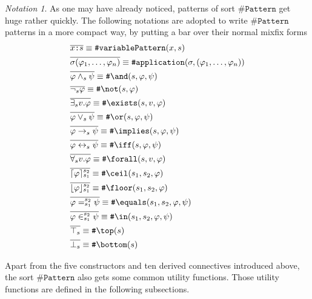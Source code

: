 \documentclass[UTF8,11pt]{article}
\newcounter{thmcounter}
\theoremstyle{plain}
\theoremstyle{definition}
\theoremstyle{remark}
\newtheorem{notation}   [thmcounter]{Notation}
\DeclarePairedDelimiter{\ceil}{\lceil}{\rceil}
\DeclarePairedDelimiter{\floor}{\lfloor}{\rfloor}
\newcommand{\cln}{\texttt{:}}
\newcommand{\sharpsymbol}{\#}
\newcommand{\KvariablePattern}{\texttt{\sharpsymbol variablePattern}}
\newcommand{\KPattern}{\texttt{\sharpsymbol Pattern}}
\newcommand{\Kand}{\texttt{\sharpsymbol  \slashsymbol and}}
\newcommand{\Kor}{\texttt{\sharpsymbol \slashsymbol  or}}
\newcommand{\Kimplies}{\texttt{\sharpsymbol  \slashsymbol implies}}
\newcommand{\Kiff}{\texttt{\sharpsymbol  \slashsymbol iff}}
\newcommand{\Knot}{\texttt{\sharpsymbol  \slashsymbol not}}
\newcommand{\Kapplication}{\texttt{\sharpsymbol application}}
\newcommand{\Kexists}{\texttt{\sharpsymbol \slashsymbol  exists}}
\newcommand{\Kforall}{\texttt{\sharpsymbol \slashsymbol  forall}}
\newcommand{\Kequals}{\texttt{\sharpsymbol \slashsymbol  equals}}
\newcommand{\Kmembership}{\Kin}
\newcommand{\Kin}{\texttt{\sharpsymbol \slashsymbol  in}}
\newcommand{\Ktop}{\texttt{\sharpsymbol \slashsymbol  top}}
\newcommand{\Kbottom}{\texttt{\sharpsymbol \slashsymbol  bottom}}
\newcommand{\Kfloor}{\texttt{\sharpsymbol \slashsymbol  floor}}
\newcommand{\Kceil}{\texttt{\sharpsymbol \slashsymbol  ceil}}
\newcommand{\slashsymbol}{\symbol{92}}
\begin{document}
\begin{notation}
	As one may have already noticed, patterns of sort $\KPattern$ get huge rather quickly.
	The following notations are adopted to write $\KPattern$ patterns in a more 
	compact way, by putting a bar over their normal mixfix forms
	\begin{align*}
	  & \overline{x \cln s} \equiv \KvariablePattern(x, s) \\
	  & \overline{\sigma(\varphi_1, \dots, \varphi_n)} \equiv 
	  \Kapplication(\sigma, (\varphi_1, \dots, \varphi_n))
	  \\
	  & \overline{\varphi \wedge_s \psi} \equiv \Kand(s, \varphi, \psi)
	  \\
	  & \overline{\neg_s \varphi} \equiv \Knot(s, \varphi)
	  \\
	  & \overline{\exists_s v . \varphi} \equiv 
	  \Kexists(s, v, \varphi)
	  \\
	  & \overline{\varphi \vee_s \psi} \equiv \Kor(s, \varphi, \psi)
	  \\
	  & \overline{\varphi \to_s \psi} \equiv \Kimplies(s, \varphi, \psi)
	  \\
	  & \overline{\varphi \leftrightarrow_s \psi} \equiv \Kiff(s, \varphi, \psi)
	  \\
	  & \overline{\forall_s v . \varphi} \equiv \Kforall(s, v, \varphi)
      \\
      & \overline{\ceil{\varphi}_{s_1}^{s_2}} \equiv \Kceil(s_1, s_2, \varphi)
      \\
      & \overline{\floor{\varphi}_{s_1}^{s_2}} \equiv \Kfloor(s_1, s_2, \varphi)
      \\
      & \overline{\varphi =_{s_1}^{s_2} \psi} \equiv \Kequals(s_1, s_2, 
      \varphi, \psi)
      \\
      & \overline{\varphi \in_{s_1}^{s_2} \psi} \equiv \Kmembership(s_1, s_2, 
      \varphi, 
      \psi)
      \\
      & \overline{\top_s} \equiv \Ktop(s)
      \\
      & \overline{\bot_s} \equiv \Kbottom(s)
	\end{align*}
\end{notation}

Apart from the five constructors and ten derived connectives introduced above, 
the sort $\KPattern$ also gets some common utility functions.
Those utility functions are defined in the following subsections.
\end{document}
